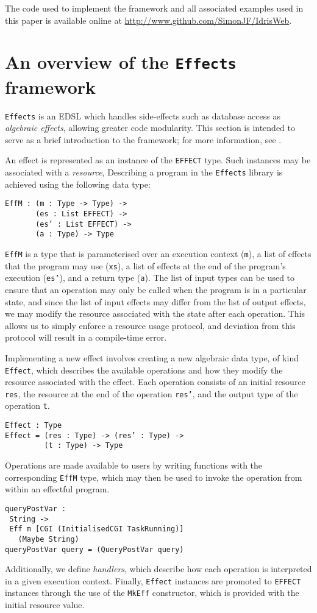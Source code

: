 \documentclass[preprint]{sigplanconf}
\begin{document}
The code used to implement the framework and all associated examples used in this paper is available online at \url{http://www.github.com/SimonJF/IdrisWeb}.

\section{An overview of the \texttt{Effects} framework}
\label{effects}
\texttt{Effects} is an EDSL which handles side-effects such as database access as \textit{algebraic effects}, allowing greater code modularity. This section is intended to serve as a brief introduction to the framework; for more information, see \cite{brady:effects}.

An effect is represented as an instance of the \texttt{EFFECT} type. Such instances may be associated with a \textit{resource}, 
Describing a program in the \texttt{Effects} library is achieved using the following data type:
{\small
\begin{verbatim}
EffM : (m : Type -> Type) ->
       (es : List EFFECT) ->
       (es’ : List EFFECT) ->
       (a : Type) -> Type
\end{verbatim}
}
\texttt{EffM} is a type that is parameterised over an execution context (\texttt{m}), a list of effects that the program may use (\texttt{xs}), a list of effects at the end of the program's execution (\texttt{es'}), and a return type (\texttt{a}). The list of input types can be used to ensure that an operation may only be called when the program is in a particular state, and since the list of input effects may differ from the list of output effects, we may modify the resource associated with the state after each operation. This allows us to simply enforce a resource usage protocol, and deviation from this protocol will result in a compile-time error.

Implementing a new effect involves creating a new algebraic data type, of kind \texttt{Effect}, which describes the available operations and how they modify the resource associated with the effect. Each operation consists of an initial resource \texttt{res}, the resource at the end of the operation \texttt{res'}, and the output type of the operation \texttt{t}.
{\small
\begin{verbatim}
Effect : Type
Effect = (res : Type) -> (res’ : Type) ->
         (t : Type) -> Type
\end{verbatim}
}
Operations are made available to users by writing functions with the corresponding \texttt{EffM} type, which may then be used to invoke the operation from within an effectful program.
{\small
\begin{verbatim}
queryPostVar : 
 String -> 
 Eff m [CGI (InitialisedCGI TaskRunning)] 
   (Maybe String)
queryPostVar query = (QueryPostVar query)
\end{verbatim}
}
Additionally, we define \textit{handlers}, which describe how each operation is interpreted in a given execution context. Finally, \texttt{Effect} instances are promoted to \texttt{EFFECT} instances through the use of the \texttt{MkEff} constructor, which is provided with the initial resource value.
\end{document}
